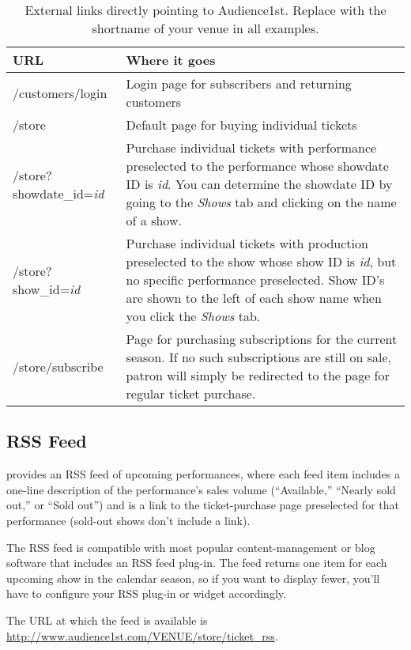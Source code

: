 \begin{table}
  \begin{tabular}{|l|p{}}
    \hline
    \textbf{URL} & \textbf{Where it goes} \\
    \hline
    /customers/login  & Login page for subscribers and returning
    customers \\
    /store & Default page for buying individual tickets \\
    /store?showdate_id=\emph{id} & Purchase individual tickets with
    performance preselected to the performance whose showdate ID is \emph{id}.
    You can determine the showdate ID by going to the \emph{Shows} tab
    and clicking on the name of a show. \\
    /store?show_id=\emph{id} & Purchase individual tickets with
    production preselected to the show whose show ID is \emph{id}, but
    no specific performance preselected.  Show
    ID's are shown to the left of each show name when you click the
    \emph{Shows} tab. \\
    /store/subscribe & Page for purchasing subscriptions for the current
    season.  If no such subscriptions are still on sale, patron will
    simply be redirected to the page for regular ticket purchase. \\
  \end{tabular}
\label{table:links}
\caption{External links directly pointing to Audience1st.  Replace
   with the shortname of your venue in all examples.}
\end{table}

\subsection{RSS Feed}
\label{sec:rss}

\af provides an RSS feed of upcoming performances, where each feed item
includes a one-line description of the performance's sales volume
(``Available,'' ``Nearly sold out,'' or ``Sold out'') and is a link to
the ticket-purchase page preselected for that performance (sold-out
shows don't include a link).

The RSS feed is compatible with most popular content-management or blog
software that includes an RSS feed plug-in.  The feed returns one item
for each upcoming show in the calendar season, so if you want to display
fewer, you'll have to configure your RSS plug-in or widget accordingly.

The URL at which the feed is available is
\url{http://www.audience1st.com/VENUE/store/ticket_rss}.


